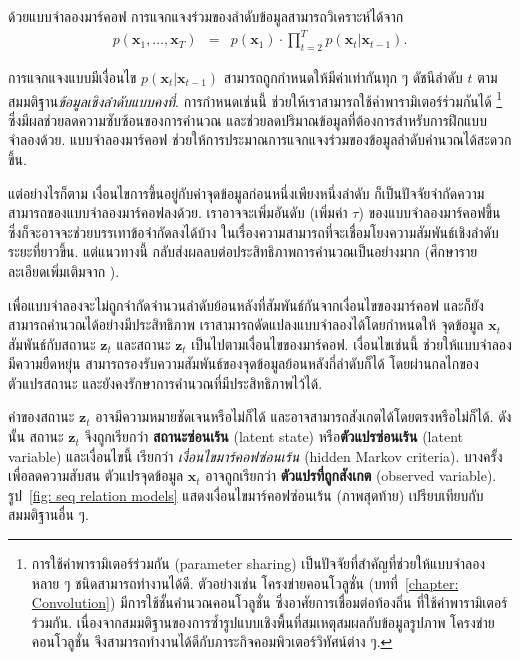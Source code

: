 ด้วยแบบจำลองมาร์คอฟ การแจกแจงร่วมของลำดับข้อมูลสามารถวิเคราะห์ได้จาก
\begin{eqnarray}
p(\bm{x}_1, \ldots, \bm{x}_T) &=& p(\bm{x}_1) \cdot \prod_{t=2}^T p(\bm{x}_t|\bm{x}_{t-1})
\label{eq: seq markov chain} .
\end{eqnarray}

การแจกแจงแบบมีเงื่อนไข $p(\bm{x}_t|\bm{x}_{t-1})$ สามารถถูกกำหนดให้มีค่าเท่ากันทุก ๆ ดัชนีลำดับ $t$ ตามสมมติฐาน\textit{ข้อมูลเชิงลำดับแบบคงที่}.
การกำหนดเช่นนี้ ช่วยให้เราสามารถใช้ค่าพารามิเตอร์ร่วมกันได้%
\footnote{%
การใช้ค่าพารามิเตอร์ร่วมกัน (parameter sharing)
เป็นปัจจัยที่สำคัญที่ช่วยให้แบบจำลองหลาย ๆ ชนิดสามารถทำงานได้ดี.
ตัวอย่างเช่น โครงข่ายคอนโวลูชั่น (บทที่~\ref{chapter: Convolution})
มีการใช้ชั้นคำนวณคอนโวลูชั่น ซึ่งอาศัยการเชื่อมต่อท้องถิ่น ที่ใช้ค่าพารามิเตอร์ร่วมกัน.
เนื่องจากสมมติฐานของการซ้ำรูปแบบเชิงพื้นที่สมเหตุสมผลกับข้อมูลรูปภาพ 
โครงข่ายคอนโวลูชั่น จึงสามารถทำงานได้ดีกับภาระกิจคอมพิวเตอร์วิทัศน์ต่าง ๆ.
}%
ซึ่งมีผลช่วยลดความซับซ้อนของการคำนวณ และช่วยลดปริมาณข้อมูลที่ต้องการสำหรับการฝึกแบบจำลองด้วย.
%
แบบจำลองมาร์คอฟ
ช่วยให้การประมาณการแจกแจงร่วมของข้อมูลลำดับคำนวณได้สะดวกขึ้น.

แต่อย่างไรก็ตาม เงื่อนไขการขึ้นอยู่กับค่าจุดข้อมูลก่อนหนึ่งเพียงหนึ่งลำดับ ก็เป็นปัจจัยจำกัดความสามารถของแบบจำลองมาร์คอฟลงด้วย.
เราอาจจะเพิ่มอันดับ (เพิ่มค่า $\tau$) ของแบบจำลองมาร์คอฟขึ้น ซึ่งก็จะอาจจะช่วยบรรเทาข้อจำกัดลงได้บ้าง ในเรื่องความสามารถที่จะเชื่อมโยงความสัมพันธ์เชิงลำดับระยะที่ยาวขึ้น.
แต่แนวทางนี้ กลับส่งผลลบต่อประสิทธิภาพการคำนวณเป็นอย่างมาก (ศึกษารายละเอียดเพิ่มเติมจาก \cite[]{Bishop2006a}).

เพื่อแบบจำลองจะไม่ถูกจำกัดจำนวนลำดับย้อนหลังที่สัมพันธ์กันจากเงื่อนไขของมาร์คอฟ และก็ยังสามารถคำนวณได้อย่างมีประสิทธิภาพ
เราสามารถดัดแปลงแบบจำลองได้โดยกำหนดให้ จุดข้อมูล $\bm{x}_t$ สัมพันธ์กับสถานะ $\bm{z}_t$
และสถานะ $\bm{z}_t$ เป็นไปตามเงื่อนไขของมาร์คอฟ.
เงื่อนไขเช่นนี้ ช่วยให้แบบจำลองมีความยืดหยุ่น สามารถรองรับความสัมพันธ์ของจุดข้อมูลย้อนหลังกี่ลำดับก็ได้ โดยผ่านกลไกของตัวแปรสถานะ
และยังคงรักษาการคำนวณที่มีประสิทธิภาพไว้ได้.

ค่าของสถานะ $\bm{z}_t$ อาจมีความหมายชัดเจนหรือไม่ก็ได้
และอาจสามารถสังเกตได้โดยตรงหรือไม่ก็ได้.
ดังนั้น สถานะ $\bm{z}_t$ จึงถูกเรียกว่า \textbf{สถานะซ่อนเร้น} (latent state) หรือ\textbf{ตัวแปรซ่อนเร้น} (latent variable) และเงื่อนไขนี้ เรียกว่า \textit{เงื่อนไขมาร์คอฟซ่อนเร้น} (hidden Markov criteria).
บางครั้ง เพื่อลดความสับสน ตัวแปรจุดข้อมูล $\bm{x}_t$ อาจถูกเรียกว่า \textbf{ตัวแปรที่ถูกสังเกต} (observed variable).
รูป~\ref{fig: seq relation models} แสดงเงื่อนไขมาร์คอฟซ่อนเร้น (ภาพสุดท้าย)
เปรียบเทียบกับสมมติฐานอื่น ๆ.

